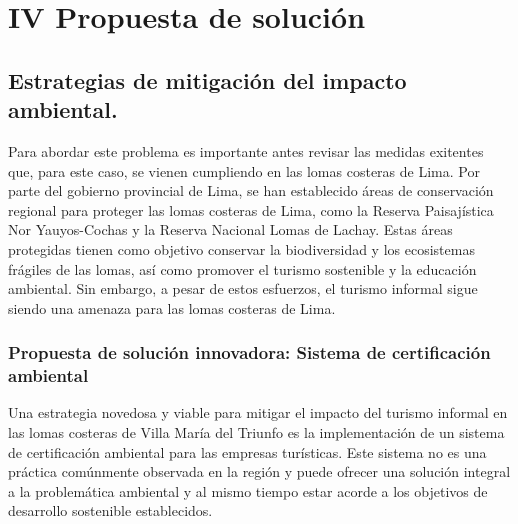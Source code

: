 \documentclass[a4paper,11pt]{article}
\begin{document}
\section{IV Propuesta de solución}
\subsection{Estrategias de mitigación del impacto ambiental.}
Para abordar este problema es importante antes revisar las medidas exitentes que, para este caso, se vienen cumpliendo en las lomas costeras de Lima. Por parte del gobierno provincial de Lima, se han establecido áreas de conservación regional para proteger las lomas costeras de Lima, como la Reserva Paisajística Nor Yauyos-Cochas y la Reserva Nacional Lomas de Lachay. Estas áreas protegidas tienen como objetivo conservar la biodiversidad y los ecosistemas frágiles de las lomas, así como promover el turismo sostenible y la educación ambiental. Sin embargo, a pesar de estos esfuerzos, el turismo informal sigue siendo una amenaza para las lomas costeras de Lima.

\subsubsection{Propuesta de solución innovadora: Sistema de certificación ambiental}

Una estrategia novedosa y viable para mitigar el impacto del turismo informal en las lomas costeras de Villa María del Triunfo es la implementación de un sistema de certificación ambiental para las empresas turísticas. Este sistema no es una práctica comúnmente observada en la región y puede ofrecer una solución integral a la problemática ambiental y al mismo tiempo estar acorde a los objetivos de desarrollo sostenible establecidos.
\end{document}
